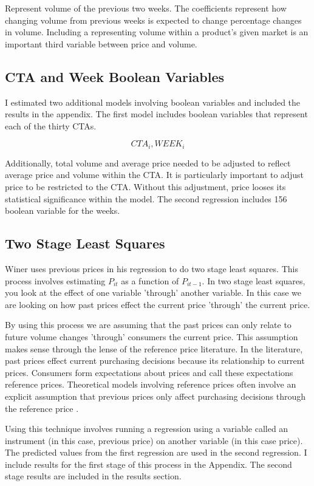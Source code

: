 \documentclass{article}
\begin{document}
Represent volume of the previous two weeks. The coefficients represent how changing volume from previous weeks is expected to change percentage changes in volume. Including a representing volume within a product's given market is an important third variable between price and volume.


\subsection{CTA and Week Boolean Variables}

I estimated two additional models involving boolean variables and included the results in the appendix. The first model includes boolean variables that represent each of the thirty CTAs.

$$ CTA_i, WEEK_{i}$$

Additionally, total volume and average price needed to be adjusted to reflect average price and volume within the CTA. It is particularly important to adjust price to be restricted to the CTA. Without this adjustment, price looses its statistical significance within the model. The second regression includes 156 boolean variable for the weeks.

\subsection{Two Stage Least Squares}

Winer uses previous prices in his regression to do two stage least squares. This process involves estimating ${P}_{it}$ as a function of ${P}_{it-1}$. In two stage least squares, you look at the effect of one variable 'through' another variable.  In this case we are looking on how past prices effect the current price 'through' the current price. 

By using this process we are assuming that the past prices can only relate to future volume changes 'through' consumers the current price. This assumption makes sense through the lense of the reference price literature. In the literature, past prices effect current purchasing decisions because its relationship to current prices. Consumers form expectations about prices and call these expectations reference prices. Theoretical models involving reference prices often involve an explicit assumption that previous prices only affect purchasing decisions through the reference price \cite{putler}.

Using this technique involves running a regression using a variable called an instrument (in this case, previous price) on another variable (in this case price). The predicted values from the first regression are used in the second regression.  I include results for the first stage of this process in the Appendix. The second stage results are included in the results section.\\
\end{document}
